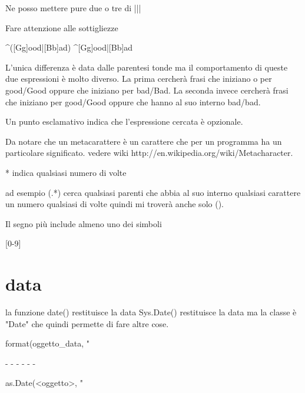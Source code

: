 Ne posso mettere pure due o tre di  |||


Fare attenzione alle sottigliezze 

^([Gg]ood|[Bb]ad)
^[Gg]ood|[Bb]ad

L'unica differenza è data dalle parentesi tonde ma il comportamento di queste due espressioni è molto diverso. La prima cercherà frasi che iniziano o per good/Good oppure che iniziano per bad/Bad. La seconda invece cercherà frasi che iniziano per good/Good oppure che hanno al suo interno bad/bad.

Un punto esclamativo indica che l'espressione cercata è opzionale.

Da notare che un metacarattere è un carattere che per un programma ha un particolare significato. vedere wiki http://en.wikipedia.org/wiki/Metacharacter.


* indica qualsiasi numero di volte

ad esempio (.*) cerca qualsiasi parenti che abbia al suo interno qualsiasi carattere un numero qualsiasi di volte quindi mi troverà anche solo ().

Il segno più include almeno uno dei simboli

[0-9]




\section{data}
la funzione date() restituisce la data
Sys.Date() restituisce la data ma la classe è "Date" che quindi permette di fare altre cose.

format(oggetto_data, "%

- %
- %
- %
- %
- %
- %

as.Date(<oggetto>, "%














